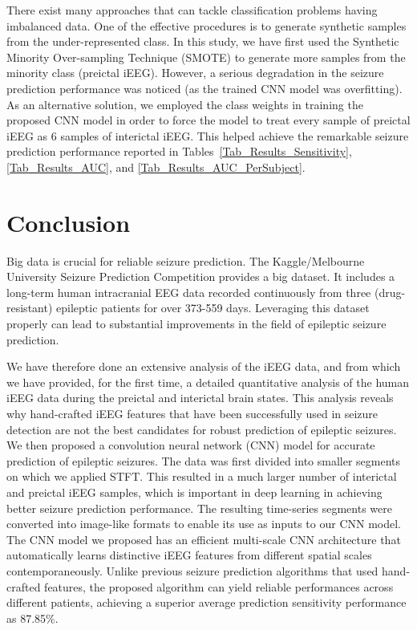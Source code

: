 \documentclass[journal]{IEEEtran}
\begin{document}
There exist many approaches that can tackle classification problems having imbalanced data. One of the effective procedures is to generate synthetic samples from the under-represented class. In this study, we have first used the Synthetic Minority Over-sampling Technique (SMOTE) \cite{chawla2002smote} to generate more samples from the minority class (preictal iEEG). However, a serious degradation in the seizure prediction performance was noticed (as the trained CNN model was overfitting). As an alternative solution, we employed the class weights in training the proposed CNN model in order to force the model to treat every sample of preictal iEEG as 6 samples of interictal iEEG. This helped achieve the remarkable seizure prediction performance reported in Tables~\ref{Tab_Results_Sensitivity}, \ref{Tab_Results_AUC}, and \ref{Tab_Results_AUC_PerSubject}.   











\section{Conclusion}
\label{Section5}

Big data is crucial for reliable seizure prediction. The Kaggle/Melbourne University Seizure Prediction Competition provides a big dataset. It includes a long-term human intracranial EEG data recorded continuously from three (drug-resistant) epileptic patients for over 373-559 days. Leveraging this dataset properly can lead to substantial improvements in the field of epileptic seizure prediction. 



We have therefore done an extensive analysis of the iEEG data, and from which we have provided,
for the first time, a detailed quantitative analysis of the human iEEG data during the preictal and interictal brain states. This analysis reveals why hand-crafted iEEG features that have been successfully used in seizure detection are not the best candidates for robust prediction of epileptic seizures. We then proposed a convolution neural network (CNN) model for accurate prediction of epileptic seizures. The data was first divided into smaller segments on which we applied STFT. This resulted in a much larger number of interictal and preictal iEEG samples, which is important in deep learning in achieving better seizure prediction performance. 
The resulting time-series segments were converted into image-like formats to enable its use as inputs to our CNN model. The CNN model we proposed has an efficient multi-scale CNN architecture that automatically learns distinctive iEEG features from different spatial scales contemporaneously.
Unlike previous seizure prediction algorithms that used hand-crafted features, the proposed algorithm can yield reliable performances across different patients, achieving a superior average prediction sensitivity performance as 87.85\%.
\end{document}
